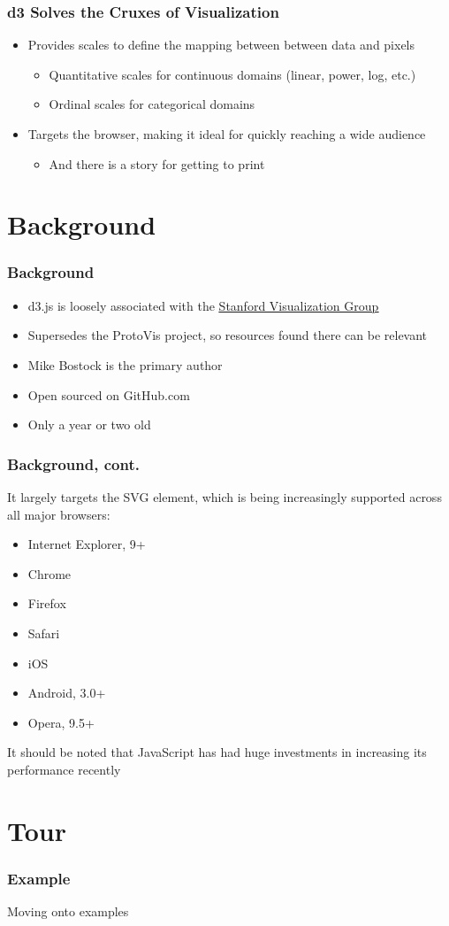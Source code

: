 \documentclass{beamer}
\begin{document}
\begin{frame}
\frametitle{d3 Solves the Cruxes of Visualization}
\begin{itemize}
\pause
\item Provides scales to define the mapping between between data and pixels
\pause
    \begin{itemize}
    \item Quantitative scales for continuous domains (linear, power, log, etc.)
\pause
    \item Ordinal scales for categorical domains
    \end{itemize}
\pause
\item Targets the browser, making it ideal for quickly reaching a wide audience
    \begin{itemize}
\pause
    \item And there is a story for getting to print
    \end{itemize}
\end{itemize}
\end{frame}



\section{Background}



\begin{frame}
\frametitle{Background}
\begin{itemize}
\item d3.js is loosely associated with the \href{http://vis.stanford.edu/}{\underline{Stanford Visualization Group}}
\pause
\item Supersedes the ProtoVis project, so resources found there can be relevant
\pause
\item Mike Bostock is the primary author
\pause
\item Open sourced on GitHub.com
\pause
\item Only a year or two old
\end{itemize}
\end{frame}



\begin{frame}
\frametitle{Background, cont.}
It largely targets the SVG element, which is being increasingly supported across all major browsers:
\pause
    \begin{itemize}
    \item Internet Explorer, 9+
    \item Chrome
    \item Firefox
    \item Safari
    \item iOS
    \item Android, 3.0+
    \item Opera, 9.5+
    \end{itemize}
\pause
It should be noted that JavaScript has had huge investments in increasing its performance recently
\end{frame}



\section{Tour}


\begin{frame}
\frametitle{Example}
Moving onto examples
\end{frame}
\end{document}
